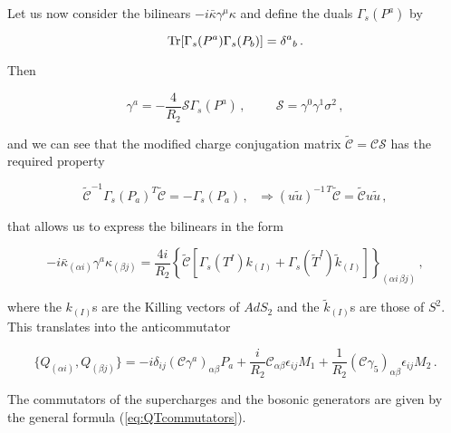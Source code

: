 \documentclass[12pt,a4paper]{article}
\begin{document}
Let us now consider the bilinears $-i\bar{\kappa}\gamma^{\mu}\kappa$
and define the duals $\Gamma_{s}(P^{a})$ by 

\begin{equation}
{\rm Tr}[\Gamma_{s}(P^{a})\Gamma_{s}(P_{b})]  =\delta^{a}{}_{b}\, .
\end{equation}

\noindent 
Then

\begin{equation}
\gamma^{a}=-{\textstyle\frac{4}{R_{2}}} \mathcal{S}\Gamma_{s}(P^{a})\, ,
\hspace{1cm}
\mathcal{S} = \gamma^{0}\gamma^{1}\sigma^{2}\, ,
\end{equation}

\noindent 
and we can see that the modified charge conjugation matrix
$\tilde{\mathcal{C}} =\mathcal{C}\mathcal{S}$ has the required
property

\begin{equation}
\tilde{\mathcal{C}}^{-1}\Gamma_{s}(P_{a})^{T}\tilde{\mathcal{C}}
= -\Gamma_{s}(P_{a})\, ,
\,\,\,\,
\Rightarrow 
(u \tilde{u})^{-1\, T}\tilde{\mathcal{C}} = \tilde{\mathcal{C}}
u \tilde{u}\, ,
\end{equation}

\noindent
that allows us to express the bilinears in the form

\begin{equation}
-i\bar{\kappa}_{(\alpha i)}\gamma^{a}\kappa_{(\beta j)}= 
{\textstyle\frac{4i}{R_{2}}}
\left\{\tilde{\mathcal{C}}[\Gamma_{s}(T^{I})k_{(I)}
+\Gamma_{s}(\tilde{T}^{I})\tilde{k}_{(I)}]
 \right\}_{(\alpha i\, \beta j)}\, ,  
\end{equation}

\noindent
where the $k_{(I)}$s are the Killing vectors of $AdS_{2}$ and the
$\tilde{k}_{(I)}$s are those of $S^{2}$. This translates into the
anticommutator

\begin{equation}
\{Q_{(\alpha i)},Q_{(\beta j)}\} =
-i\delta_{ij}(\mathcal{C}\gamma^{a})_{\alpha\beta}P_{a}
+{\textstyle\frac{i}{R_{2}}}\mathcal{C}_{\alpha\beta}  \epsilon_{ij} M_{1}
+{\textstyle\frac{1}{R_{2}}}(\mathcal{C}\gamma_{5})_{\alpha\beta}  
\epsilon_{ij} M_{2}\, .
\end{equation}

The commutators of the supercharges and the bosonic generators are
given by the general formula (\ref{eq:QTcommutators}).


\end{document}
